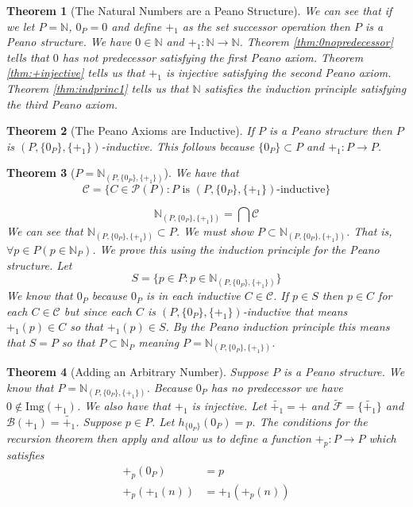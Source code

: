 \documentclass[12pt]{article}
\theoremstyle{break}
\theoremstyle{break}
\newtheorem{theorem}{Theorem}[section]
\theoremstyle{break}
\theoremstyle{break}
\theoremstyle{break}
\newtheorem{informal definition}[definition]{Informal Definition}
\begin{document}
\begin{theorem}[The Natural Numbers are a Peano Structure]
We can see that if we let $P= \mathbb{N}$, $0_P = 0$ and define $+_1$ as the set successor operation then $P$ is a Peano structure.
We have $0 \in \mathbb{N}$ and $+_1:\mathbb{N}\to \mathbb{N}$.
Theorem \ref{thm:0nopredecessor} tells that $0$ has not predecessor satisfying the first Peano axiom.
Theorem \ref{thm:+injective} tells us that $+_1$ is injective satisfying the second Peano axiom.
Theorem \ref{thm:indprinc1} tells us that $\mathbb{N}$ satisfies the induction principle satisfying the third Peano axiom.
\end{theorem}

\begin{theorem}[The Peano Axioms are Inductive]
If $P$ is a Peano structure then $P$ is $(P, \{0_P\}, \{+_1\})$-inductive.
This follows because $\{0_P\} \subset P$ and $+_1:P\to P$.
\end{theorem}

\begin{theorem}[$P = \mathbb{N}_{(P, \{0_P\}, \{+_1\})}$]
We have that
$$
\mathcal{C}  = \{C\in \mathcal{P}(P): P \text{ is } (P, \{0_P\}, \{+_1\})\text{-inductive}\}
$$

$$
\mathbb{N}_{(P, \{0_P\}, \{+_1\})} = \bigcap \mathcal{C}
$$
We can see that $\mathbb{N}_{(P, \{0_P\}, \{+_1\})}  \subset P$.
We must show $P \subset \mathbb{N}_{(P, \{0_P\}, \{+_1\})} $.
That is, $\forall p \in P (p \in \mathbb{N}_P)$.
We prove this using the induction principle for the Peano structure.
Let
$$
S = \{p \in P: p \in \mathbb{N}_{(P, \{0_P\}, \{+_1\})} \}
$$
We know that $0_P$ because $0_P$ is in each inductive $C\in \mathcal{C}$.
If $p \in S$ then $p\in C$ for each $C \in \mathcal{C}$ but since each $C$ is $(P, \{0_P\}, \{+_1\})$-inductive that means $+_1(p) \in C$ so that $+_1(p) \in S$.
By the Peano induction principle this means that $S=P$ so that $P \subset \mathbb{N}_P$ meaning $P= \mathbb{N}_{(P, \{0_P\}, \{+_1\})} $.
\end{theorem}

\begin{theorem}[Adding an Arbitrary Number]
Suppose $P$ is a Peano structure.
We know that $P=\mathbb{N}_{(P, \{0_P\}, \{+_1\})}$.
Because $0_P$ has no predecessor we have $0\not \in \text{Img}(+_1)$.
We also have that $+_1$ is injective.
Let $\tilde{+_1} = +$ and $\tilde{\mathcal{F}} = \{\tilde{+_1}\}$ and $\mathcal{B}(+_1) = \tilde{+_1}$.
Suppose $p\in P$.
Let $h_{\{0_P\}}(0_P) = p$.
The conditions for the recursion theorem then apply and allow us to define a function $+_p:P\to P$ which satisfies
\begin{align*}
+_p(0_P) &= p \\
+_p(+_1(n)) &= +_1(+_p(n))
\end{align*}
\end{theorem}
\end{document}
